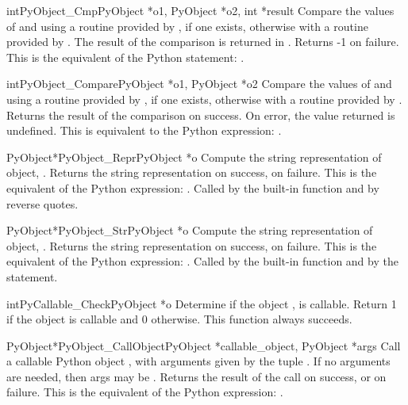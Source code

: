      \begin{cfuncdesc}{int}{PyObject_Cmp}{PyObject *o1, PyObject *o2, int *result}
	 Compare the values of  and  using a routine provided by
	 , if one exists, otherwise with a routine provided by .
	 The result of the comparison is returned in .  Returns
	 -1 on failure.  This is the equivalent of the Python
	 statement: .
     \end{cfuncdesc}


     \begin{cfuncdesc}{int}{PyObject_Compare}{PyObject *o1, PyObject *o2}
	 Compare the values of  and  using a routine provided by
	 , if one exists, otherwise with a routine provided by .
	 Returns the result of the comparison on success.  On error,
	 the value returned is undefined. This is equivalent to the
	 Python expression: .
     \end{cfuncdesc}


     \begin{cfuncdesc}{PyObject*}{PyObject_Repr}{PyObject *o}
	 Compute the string representation of object, .  Returns the
	 string representation on success, {\NULL} on failure.  This is
	 the equivalent of the Python expression: .
	 Called by the  built-in function and by reverse quotes.
     \end{cfuncdesc}


     \begin{cfuncdesc}{PyObject*}{PyObject_Str}{PyObject *o}
	 Compute the string representation of object, .  Returns the
	 string representation on success, {\NULL} on failure.  This is
	 the equivalent of the Python expression: .
	 Called by the  built-in function and by the 
	 statement.
     \end{cfuncdesc}


     \begin{cfuncdesc}{int}{PyCallable_Check}{PyObject *o}
	 Determine if the object , is callable.  Return 1 if the
	 object is callable and 0 otherwise.
	 This function always succeeds.
     \end{cfuncdesc}


     \begin{cfuncdesc}{PyObject*}{PyObject_CallObject}{PyObject *callable_object, PyObject *args}
	 Call a callable Python object , with
	 arguments given by the tuple .  If no arguments are
	 needed, then args may be {\NULL}.  Returns the result of the
	 call on success, or {\NULL} on failure.  This is the equivalent
	 of the Python expression: .
     \end{cfuncdesc}

